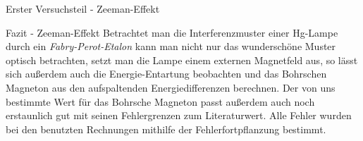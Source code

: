 \documentclass[pdftex, a4paper,11pt, twoside, ngerman]{report}
\begin{document}
\begin{chapter}{Erster Versuchsteil - Zeeman-Effekt}
    \begin{section}{Fazit - Zeeman-Effekt}
      \label{chp:ZeemanEffekt:sec:Fazit}
      Betrachtet man die Interferenzmuster einer Hg-Lampe durch ein
      \textit{Fabry-Perot-Etalon} kann man nicht nur das wunderschöne Muster
      optisch betrachten, setzt man die Lampe einem externen Magnetfeld aus,
      so lässt sich außerdem auch die Energie-Entartung beobachten und das
      Bohrschen Magneton aus den aufspaltenden Energiedifferenzen berechnen.
      Der von uns bestimmte Wert für das Bohrsche Magneton passt außerdem auch
      noch erstaunlich gut mit seinen Fehlergrenzen zum Literaturwert.
      Alle Fehler wurden bei den benutzten Rechnungen mithilfe der
      Fehlerfortpflanzung bestimmt.
    \end{section}
    
  \end{chapter}
  
  
  
\end{document}
